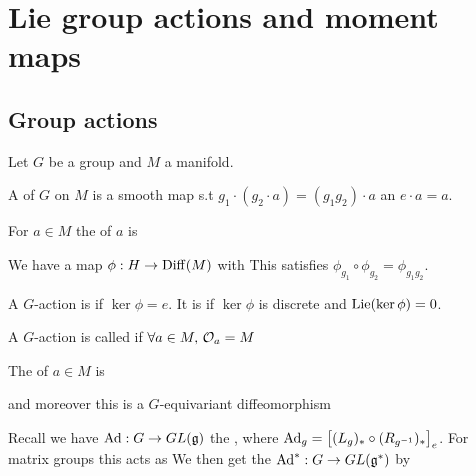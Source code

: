 \documentclass{article}
\begin{document}
\section{Lie group actions and moment maps}

\subsection{Group actions}

Let $G$ be a group and $M$ a manifold. 
\begin{definition}
A  of $G$ on $M$ is a smooth map 
s.t $g_1 \cdot(g_2 \cdot a) = (g_1 g_2) \cdot a$ an $e \cdot a = a$. 
\end{definition}

\begin{definition}
For $a \in M$ the  of $a$ is 
\end{definition}

We have a map $\phi: H \to \operatorname{Diff}(M)$ with 
This satisfies $\phi_{g_1} \circ \phi_{g_2} = \phi_{g_1 g_2}$. 

\begin{definition}
A $G$-action is  if $\ker\phi = e$. It is  if $\ker\phi$ is discrete and $\operatorname{Lie}(\ker\phi) = 0$.
\end{definition}

\begin{definition}
A $G$-action is called  if $\forall a \in M, \, \mathcal{O}_a =M$
\end{definition}

\begin{definition}
The  of $a \in M$ is 
\end{definition}

\begin{theorem}
and moreover this is a $G$-equivariant diffeomorphism 
\end{theorem}

\begin{example}
Recall we have $\operatorname{Ad}:G \to GL(\mathfrak{g})$ the , where $\operatorname{Ad}_g = \left[ (L_g)_\ast \circ (R_{g^{-1}})_\ast \right]_e$. For matrix groups this acts as 
We then get the  $\operatorname{Ad}^\ast :G \to GL(\mathfrak{g}^\ast)$ by 
\end{example}
\end{document}
